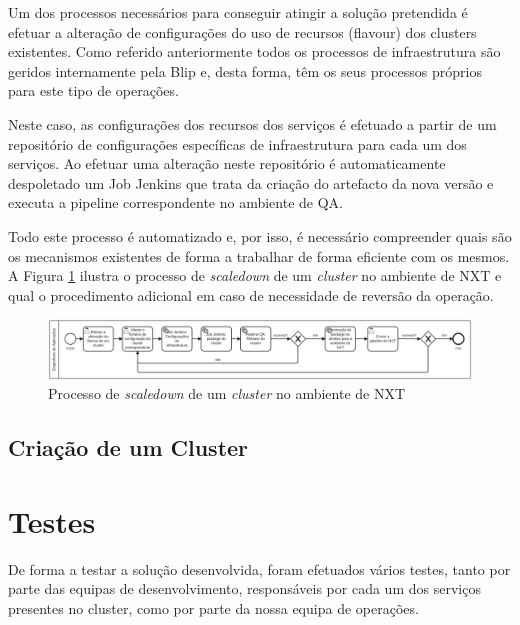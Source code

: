 Um dos processos necessários para conseguir atingir a solução pretendida é efetuar a alteração
de configurações do uso de recursos (\gls{flavour}) dos \glspl{cluster} existentes. Como
referido anteriormente todos os processos de infraestrutura são geridos internamente pela Blip e,
desta forma, têm os seus processos próprios para este tipo de operações.

Neste caso, as configurações dos recursos dos serviços é efetuado a partir de um repositório 
de configurações específicas de infraestrutura para cada um dos serviços. Ao efetuar uma alteração
neste repositório é automaticamente despoletado um Job Jenkins que trata da criação do artefacto
da nova versão e executa a \gls{pipeline} correspondente no ambiente de \ac{QA}.

Todo este processo é automatizado e, por isso, é necessário compreender quais são os mecanismos
existentes de forma a trabalhar de forma eficiente com os mesmos. A Figura \ref{scaledown-nxt} 
ilustra o processo de \textit{scaledown} de um \textit{cluster} no ambiente de NXT e qual o 
procedimento adicional em caso de necessidade de reversão da operação.

\begin{figure}[H]
  \centerline{\includegraphics[scale=0.12]{media/content/impl/scaledown_nxt.png}}
  \caption{Processo de \textit{scaledown} de um \textit{cluster} no ambiente de NXT}
  \label{scaledown-nxt}
\end{figure}

\subsection{Criação de um Cluster}


\section{Testes}

De forma a testar a solução desenvolvida, foram efetuados vários testes, tanto por parte das
equipas de desenvolvimento, responsáveis por cada um dos serviços presentes no \gls{cluster},
como por parte da nossa equipa de operações. 

